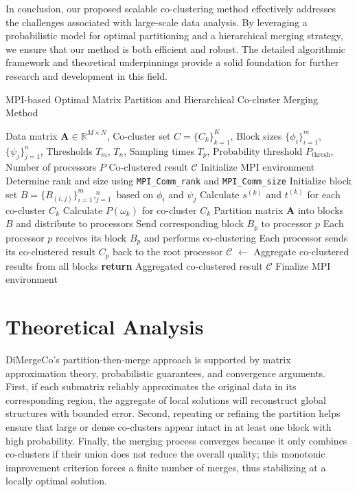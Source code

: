 \documentclass[journal]{IEEEtran}
\begin{document}
In conclusion, our proposed scalable co-clustering method effectively addresses the challenges associated with large-scale data analysis. By leveraging a probabilistic model for optimal partitioning and a hierarchical merging strategy, we ensure that our method is both efficient and robust. The detailed algorithmic framework and theoretical underpinnings provide a solid foundation for further research and development in this field.

\begin{algorithm}[!t]
    \caption{MPI-based Optimal Matrix Partition and Hierarchical Co-cluster Merging Method}
    \begin{algorithmic}[1]
        \REQUIRE Data matrix $\mathbf{A} \in \mathbb{R}^{M \times N}$, Co-cluster set $C = \{C_k\}_{k=1}^K$, Block sizes $\{\phi_i\}_{i=1}^m$, $\{\psi_j\}_{j=1}^n$, Thresholds $T_m$, $T_n$, Sampling times $T_p$, Probability threshold $P_\text{thresh}$, Number of processors $P$
        \ENSURE Co-clustered result $\mathcal{C}$
        \STATE Initialize MPI environment
        \STATE Determine rank and size using \texttt{MPI\_Comm\_rank} and \texttt{MPI\_Comm\_size}
        \STATE Initialize block set $B = \{B_{(i,j)}\}_{i=1}^m,_{j=1}^n$ based on $\phi_i$ and $\psi_j$
        \STATE Calculate $s^{(k)}$ and $t^{(k)}$ for each co-cluster $C_k$
        \STATE Calculate $P(\omega_k)$ for co-cluster $C_k$
        \STATE Partition matrix $\mathbf{A}$ into blocks $B$ and distribute to processors
        \STATE Send corresponding block $B_p$ to processor $p$
        \ENDFOR
        \ENDIF
        \ENDFOR
        \ENDIF
        \STATE Each processor $p$ receives its block $B_p$ and performs co-clustering
        \STATE Each processor sends its co-clustered result $C_p$ back to the root processor
        \STATE $\mathcal{C}$ $\gets$ Aggregate co-clustered results from all blocks
        \STATE \textbf{return} Aggregated co-clustered result $\mathcal{C}$
        \ENDIF
        \STATE Finalize MPI environment
    \end{algorithmic}
    \label{alg:mpi-method}
\end{algorithm}


\section{Theoretical Analysis}
\label{sec:theoretical-foundations}
DiMergeCo's partition-then-merge approach is supported by matrix approximation theory, probabilistic guarantees, and convergence arguments. First, if each submatrix reliably approximates the original data in its corresponding region, the aggregate of local solutions will reconstruct global structures with bounded error. Second, repeating or refining the partition helps ensure that large or dense co-clusters appear intact in at least one block with high probability. Finally, the merging process converges because it only combines co-clusters if their union does not reduce the overall quality; this monotonic improvement criterion forces a finite number of merges, thus stabilizing at a locally optimal solution.
\end{document}
